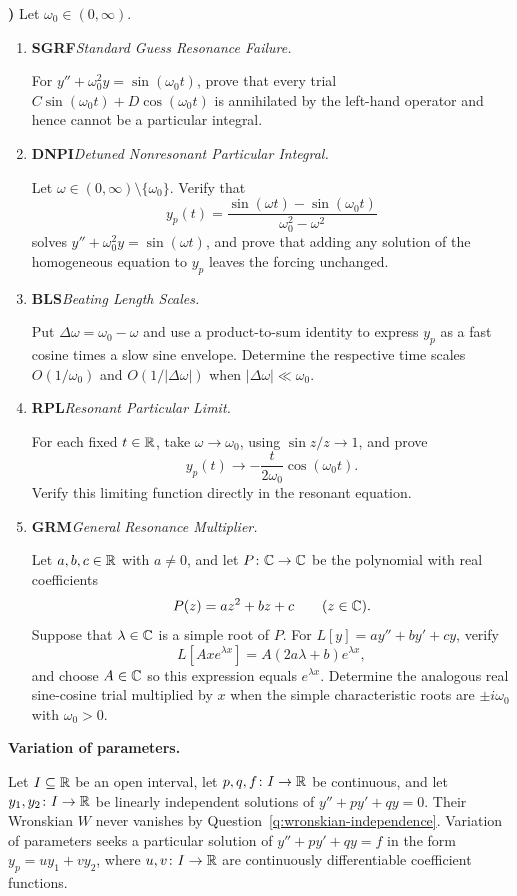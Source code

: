 \documentclass[10pt,a4paper]{article}
\newcounter{examquestion}
\newcommand{\examquestion}[1]{%
  \Needspace{5\baselineskip}%
  \refstepcounter{examquestion}%
  \par\addvspace{0.8\baselineskip}%
  \noindent\textbf{\theexamquestion)}\enspace #1\par
}
\newenvironment{subquestions}
  {\begin{enumerate}[label=\alph*),leftmargin=2.1em]}
  {\end{enumerate}}
\newcommand{\nameditem}[2]{%
  \textbf{\textsf{#1}}\enspace\emph{#2.}\enspace
}
\newcommand{\concept}[1]{%
  \par\addvspace{0.55\baselineskip}\noindent\textbf{#1.}\enspace
}
\begin{document}
\examquestion{\label{q:resonance}
Let $\omega_0\in(0,\infty)$.
\begin{subquestions}
  \item \nameditem{SGRF}{Standard Guess Resonance Failure}
  For $y''+\omega_0^2y=\sin(\omega_0t)$, prove that every trial
  $C\sin(\omega_0t)+D\cos(\omega_0t)$ is annihilated by the left-hand
  operator and hence cannot be a particular integral.

  \item \nameditem{DNPI}{Detuned Nonresonant Particular Integral}
  Let $\omega\in(0,\infty)\setminus\{\omega_0\}$.  Verify that
  \[
    y_p(t)=\frac{\sin(\omega t)-\sin(\omega_0t)}
                 {\omega_0^2-\omega^2}
  \]
  solves $y''+\omega_0^2y=\sin(\omega t)$, and prove that adding any
  solution of the homogeneous equation to $y_p$ leaves the forcing
  unchanged.

  \item \nameditem{BLS}{Beating Length Scales}
  Put $\Delta\omega=\omega_0-\omega$ and use a product-to-sum identity to
  express $y_p$ as a fast cosine times a slow sine envelope.  Determine the
  respective time scales $O(1/\omega_0)$ and
  $O(1/|\Delta\omega|)$ when $|\Delta\omega|\ll\omega_0$.

  \item \nameditem{RPL}{Resonant Particular Limit}
  For each fixed $t\in\mathbb{R}$, take $\omega\to\omega_0$, using
  $\sin z/z\to1$, and prove
  \[
    y_p(t)\longrightarrow-\frac{t}{2\omega_0}\cos(\omega_0t).
  \]
  Verify this limiting function directly in the resonant equation.

  \item \nameditem{GRM}{General Resonance Multiplier}
  Let $a,b,c\in\mathbb{R}$ with $a\ne0$, and let $P\colon\mathbb{C}\to\mathbb{C}$ be the
  polynomial with real coefficients
  \[
    P(z)=az^2+bz+c\qquad(z\in\mathbb{C}).
  \]
  Suppose that $\lambda\in\mathbb{C}$ is a simple root of $P$.  For
  $L[y]=ay''+by'+cy$, verify
  \[
    L[Axe^{\lambda x}]=A(2a\lambda+b)e^{\lambda x},
  \]
  and choose $A\in\mathbb{C}$ so this expression equals $e^{\lambda x}$.
  Determine the analogous real sine-cosine trial multiplied by $x$ when the
  simple characteristic roots are $\pm i\omega_0$ with $\omega_0>0$.
\end{subquestions}}

\concept{Variation of parameters}
Let $I\subseteq\mathbb{R}$ be an open interval, let $p,q,f\colon I\to\mathbb{R}$ be
continuous, and let $y_1,y_2\colon I\to\mathbb{R}$ be linearly independent
solutions of $y''+py'+qy=0$.  Their Wronskian $W$ never vanishes by
Question~\ref{q:wronskian-independence}.  Variation of parameters seeks a particular
solution of $y''+py'+qy=f$ in the form $y_p=uy_1+vy_2$, where
$u,v\colon I\to\mathbb{R}$ are continuously differentiable coefficient functions.
\end{document}
